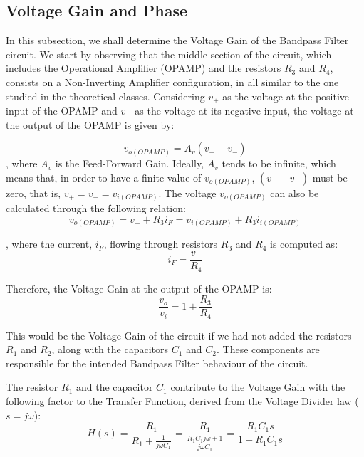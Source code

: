 \subsection{Voltage Gain and Phase}		\label{sec:gainPhase}

In this subsection, we shall determine the Voltage Gain of the Bandpass Filter circuit.
We start by observing that the middle section of the circuit, which includes the Operational Amplifier (OPAMP) and the resistors $R_3$ and $R_4$, consists on a Non-Inverting Amplifier configuration, in all similar to the one studied in the theoretical classes. Considering $v_+$ as the voltage at the positive input of the OPAMP and $v_-$ as the voltage at its negative input, the voltage at the output of the OPAMP is given by:

\begin{equation}
	v_{o(OPAMP)} = A_v (v_+ - v_-)
	\label{eq:voOPAMP1}
\end{equation} 
, where $A_v$ is the Feed-Forward Gain. Ideally, $A_v$ tends to be infinite, which means that, in order to have a finite value of $v_{o(OPAMP)}$, $(v_+ - v_-)$ must be zero, that is, $v_+ = v_- = v_{i(OPAMP)}$.
The voltage $v_{o(OPAMP)}$ can also be calculated through the following relation:
\begin{equation}
	v_{o(OPAMP)} = v_- + R_3 i_F = v_{i(OPAMP)} + R_3 i_{i(OPAMP)}
	\label{eq:voOPAMP2}
\end{equation}

, where the current, $i_F$, flowing through resistors $R_3$ and $R_4$ is computed as:
\begin{equation}
	i_F = \frac{v_-}{R_4}
	\label{eq:vMinus}
\end{equation}

Therefore, the Voltage Gain at the output of the OPAMP is:
\begin{equation}
	\frac{v_o}{v_i} = 1 + \frac{R_3}{R_4}
	\label{eq:gainOPAMP}
\end{equation}

This would be the Voltage Gain of the circuit if we had not added the resistors $R_1$ and $R_2$, along with the capacitors $C_1$ and $C_2$. These components are responsible for the intended Bandpass Filter behaviour of the circuit. 

The resistor $R_1$ and the capacitor $C_{1}$ contribute to the Voltage Gain with the following factor to the Transfer Function, derived from the Voltage Divider law ($s=j\omega$):
\begin{equation}
	H(s)=\frac{R_1}{R_1+\frac{1}{j\omega C_1}}=\frac{R_1}{\frac{R_1 C_1j\omega +1}{j\omega C_1}} = \frac{R_1 C_1 s}{1 + R_1 C_1 s} 
	\label{eq:hs}
\end{equation}


